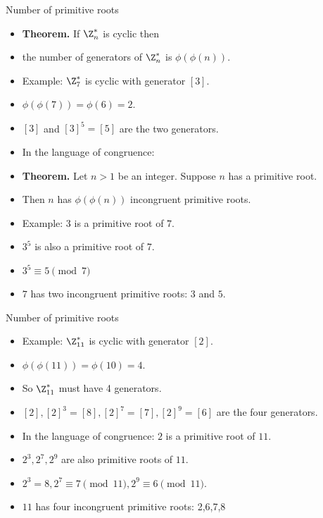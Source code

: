 \documentclass{beamer}
\begin{document}
\begin{frame}{Number of primitive roots}

\begin{itemize}
  \item \textbf{Theorem.} If $\Z_n^*$ is cyclic then
  \item the number of generators of $\Z_n^*$ is $\phi(\phi(n))$.
  \item Example: $\Z_7^*$ is cyclic with generator $[3]$.
  \item $\phi(\phi(7)) = \phi(6) = 2$.
  \item $[3]$ and $[3]^5 = [5]$ are the two generators.
  \item In the language of congruence:
  \item \textbf{Theorem.} Let $n>1$ be an integer. Suppose $n$ has a primitive root.
  \item Then $n$ has $\phi(\phi(n))$ incongruent primitive roots.
  \item Example: $3$ is a primitive root of $7$.
  \item $3^5$ is also a primitive root of $7$.
  \item $3^5 \equiv 5 \pmod 7$
  \item $7$ has two incongruent primitive roots: $3$ and $5$.
\end{itemize}

\end{frame}

\begin{frame}{Number of primitive roots}

\begin{itemize}
  \item Example: $\Z_{11}^*$ is cyclic with generator $[2]$.
  \item $\phi(\phi(11)) = \phi(10) = 4$.
  \item So $\Z_{11}^*$ must have 4 generators.
  \item $[2],[2]^3=[8], [2]^7=[7], [2]^9 = [6]$ are the four generators.
  \item In the language of congruence: $2$ is a primitive root of $11$.
  \item $2^3,2^7,2^9$ are also primitive roots of $11$.
  \item $2^3 = 8, 2^7 \equiv 7 \pmod{11}, 2^9 \equiv 6 \pmod {11}$.
  \item $11$ has four incongruent primitive roots: 2,6,7,8
\end{itemize}

\end{frame}
\end{document}
